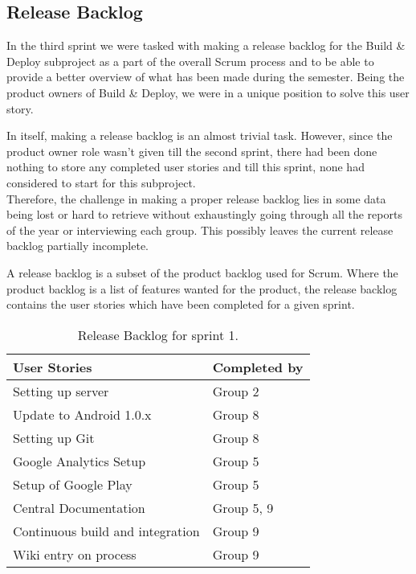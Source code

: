 \subsection{Release Backlog} \label{Roles_SecReleaseBacklog}

In the third sprint we were tasked with making a release backlog for the Build \& Deploy subproject as a part of the overall Scrum process and to be able to provide a better overview of what has been made during the semester. Being the product owners of Build \& Deploy, we were in a unique position to solve this user story.

In itself, making a release backlog is an almost trivial task. However, since the product owner role wasn't given till the second sprint, there had been done nothing to store any completed user stories and till this sprint, none had considered to start for this subproject.\\
Therefore, the challenge in making a proper release backlog lies in some data being lost or hard to retrieve without exhaustingly going through all the reports of the year or interviewing each group. This possibly leaves the current release backlog partially incomplete.

A release backlog is a subset of the product backlog used for Scrum. Where the product backlog is a list of features wanted for the product, the release backlog contains the user stories which have been completed for a given sprint.

\begin{table}
	\centering
	\begin{tabular}{ll}
		\textbf{User Stories} & \textbf{Completed by}\\ \hline \noalign{\vskip 2mm}
		Setting up server & Group 2\\ \hline
		Update to Android 1.0.x & Group 8\\ \hline
		Setting up Git & Group 8\\ \hline
		Google Analytics Setup & Group 5\\ \hline
		Setup of Google Play & Group 5\\ \hline
		Central Documentation & Group 5, 9\\ \hline
		Continuous build and integration & Group 9\\ \hline
		Wiki entry on process & Group 9\\ \hline
	\end{tabular}
	\caption{Release Backlog for sprint 1.}
	\label{Roles_ReleaseBacklogSprint1_table}
\end{table}

